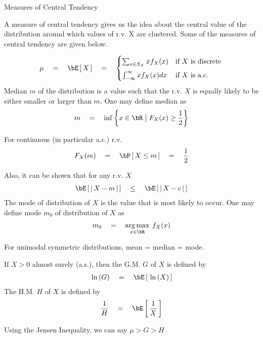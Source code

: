 \documentclass{article}
\begin{document}
\makeheader%

\begin{ssection}{Measures of Central Tendency}

	A measure of central tendency gives us the idea about the central value of the distribution around which values of r.v. X are clustered. Some of the measures of central tendency are given below.

	\begin{enumerate}[label=\bt{\theenumi.}]
			\begin{align*}
				\mu	\eq	\E{X}	\eq	\begin{cases}
					\sum_{x \in S_X} x f_X(x)			&\mt{if $X$ is discrete} \\[0.5em]
					\int_{-\infty}^\infty x f_X(x) dx	&\mt{if $X$ is a.c.}
				\end{cases}
			\end{align*}
		\ditem[Median] Median $m$ of the distribution is a value such that the r.v. $X$ is equally likely to be either smaller or larger than $m$. One may define median as
			\begin{align*}
				m	\eq	\inf\set{x \in \bR \pipe F_X(x) \ge \frac{1}{2}}
			\end{align*}

			For continuous (in particular a.c.) r.v.
			\begin{align*}
				F_X(m)	\eq	\prob{X \le m}	\eq \frac{1}{2}
			\end{align*}

			Also, it can be shown that for any r.v. $X$
			\begin{align*}
				\E{\abs{X - m}}	\qle	\E{\abs{X - c}}
			\end{align*}
		\ditem[Mode] The mode of distribution of $X$ is the value that is most likely to occur. One may define mode $m_0$ of distribution of $X$ as
			\begin{align*}
				m_0	\eq	\argmax{x \in \bR} f_X(x)
			\end{align*}

			\begin{remark}
				For unimodal symmetric distributions, mean = median = mode.
			\end{remark}
		 If $X > 0$ almost surely (a.s.), then the G.M. $G$ of $X$ is defined by
			\begin{align*}
				\ln{G}	\eq	\E{\ln{X}}
			\end{align*}
		 The H.M. $H$ of $X$ is defined by
			\begin{align*}
				\frac{1}{H}	\eq	\E{\frac{1}{X}}
			\end{align*}

			\begin{remark}
				Using the Jensen Inequality, we can say $\mu > G > H$
			\end{remark}
	\end{enumerate}

\end{ssection}
\end{document}
